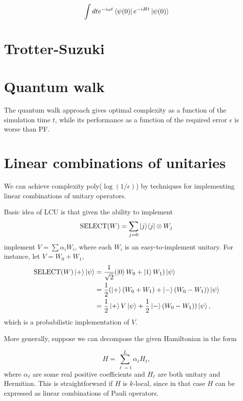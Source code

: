 \documentclass[11pt, oneside]{article}   	%
\begin{document}
\begin{equation*} 
\int dt e^{-i \omega t} \bra{\psi(0)} e^{-i H t} \ket{\psi(0)}
\end{equation*}

\section{Trotter-Suzuki}
\section{Quantum walk}
The quantum walk approach gives optimal complexity as a function of the simulation time $t$, while its performance as a function of the required error $\epsilon$ is worse than PF.

\section{Linear combinations of unitaries}
We can achieve complexity poly($\log(1/\epsilon)$) by techniques for implementing linear combinations of unitary operators.

Basic idea of LCU is that given the ability to implement 
\begin{equation*} 
\textrm{SELECT}(W) = \sum_{j= 0} \ket{j} \! \bra{j} \otimes W_j
\end{equation*}
implement $V = \sum \alpha_i W_i$, where each $W_i$ is an easy-to-implement unitary.
For instance, let $V = W_0 + W_1$,
\begin{align*} 
\textrm{SELECT}(W) \ket{+} \ket{\psi} 
&= \frac{1}{\sqrt{2}} (\ket{0} W_0 + \ket{1} W_1) \ket{\psi} \\
&= \frac{1}{2} (\ket{+} (W_0 + W_1) + \ket{-} (W_0 - W_1)) \ket{\psi} \\
&= \frac{1}{2} \ket{+} V \ket{\psi} + \frac{1}{2} \ket{-} (W_0 - W_1)) \ket{\psi},
\end{align*}
which is a probabilistic implementation of $V$.

More generally, suppose we can decompose the given Hamiltonian in the form

\begin{equation*} 
H = \sum^L_{\ell = 1} \alpha_{\ell} H_{\ell},
\end{equation*}
where $\alpha_{\ell}$ are some real positive coefficients and $H_{\ell}$ are both unitary and Hermitian.
This is straightforward if $H$ is $k$-local, since in that case $H$ can be expressed as linear combinations of Pauli operators.
\end{document}
